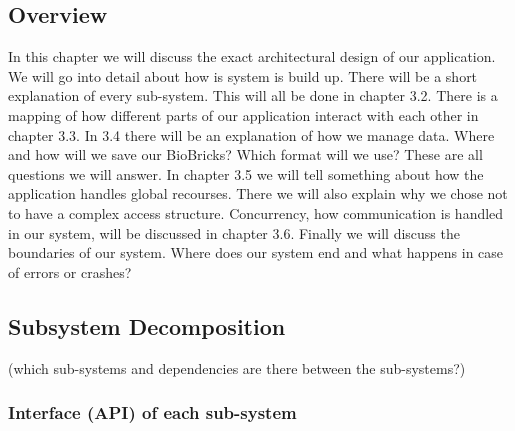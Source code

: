 \documentclass[a4paper]{article}
\begin{document}
\subsection{Overview}
In this chapter we will discuss the exact architectural design of our application. We will go into detail about how is system is build up. There will be a short explanation of every sub-system. This will all be done in chapter 3.2. There is a mapping of how different parts of our application interact with each other in chapter 3.3. In 3.4 there will be an explanation of how we manage data. Where and how will we save our BioBricks? Which format will we use? These are all questions we will answer. In chapter 3.5 we will tell something about how the application handles global recourses. There we will also explain why we chose not to have a complex access structure. Concurrency, how communication is handled in our system, will be discussed in chapter 3.6. Finally we will discuss the boundaries of our system. Where does our system end and what happens in case of errors or crashes? 
\subsection{Subsystem Decomposition}
(which sub-systems and dependencies are there between the sub-systems?)

\subsubsection{Interface (API) of each sub-system}
\end{document}
